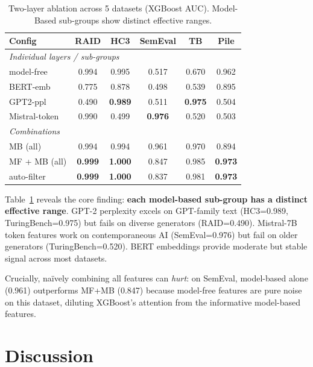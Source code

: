 \documentclass[sigconf,nonacm]{acmart}
\begin{document}
\begin{table}[t]
\caption{Two-layer ablation across 5 datasets (XGBoost AUC). Model-Based sub-groups show distinct effective ranges.}
\label{tab:threelayer}
\small
\begin{tabular}{lccccc}
\toprule
\textbf{Config} & \textbf{RAID} & \textbf{HC3} & \textbf{SemEval} & \textbf{TB} & \textbf{Pile} \\
\midrule
\multicolumn{6}{l}{\textit{Individual layers / sub-groups}} \\
model-free     & 0.994 & 0.995 & 0.517 & 0.670 & 0.962 \\
BERT-emb       & 0.775 & 0.878 & 0.498 & 0.539 & 0.895 \\
GPT2-ppl       & 0.490 & \textbf{0.989} & 0.511 & \textbf{0.975} & 0.504 \\
Mistral-token  & 0.990 & 0.499 & \textbf{0.976} & 0.520 & 0.503 \\
\midrule
\multicolumn{6}{l}{\textit{Combinations}} \\
MB (all)        & 0.994 & 0.994 & 0.961 & 0.970 & 0.894 \\
MF + MB (all)   & \textbf{0.999} & \textbf{1.000} & 0.847 & 0.985 & \textbf{0.973} \\
auto-filter     & \textbf{0.999} & \textbf{1.000} & 0.837 & 0.981 & \textbf{0.973} \\
\bottomrule
\end{tabular}
\end{table}

Table~\ref{tab:threelayer} reveals the core finding: \textbf{each model-based sub-group has a distinct effective range}. GPT-2 perplexity excels on GPT-family text (HC3=0.989, TuringBench=0.975) but fails on diverse generators (RAID=0.490). Mistral-7B token features work on contemporaneous AI (SemEval=0.976) but fail on older generators (TuringBench=0.520). BERT embeddings provide moderate but stable signal across most datasets.

Crucially, na\"{i}vely combining all features can \emph{hurt}: on SemEval, model-based alone (0.961) outperforms MF+MB (0.847) because model-free features are pure noise on this dataset, diluting XGBoost's attention from the informative model-based features.

\section{Discussion}
\end{document}
